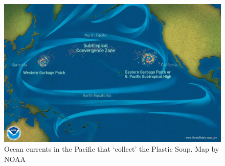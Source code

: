 \begin{figure}[h!bt]
\centering
\ifx\showfig\undefined
\includegraphics[keepaspectratio=true,width=.8\textwidth]{images/garbage-patch.jpg} \fi
\caption{Ocean currents in the Pacific that `collect' the Plastic Soup. Map by NOAA }
\label{fig:plastic-where}
\end{figure}


